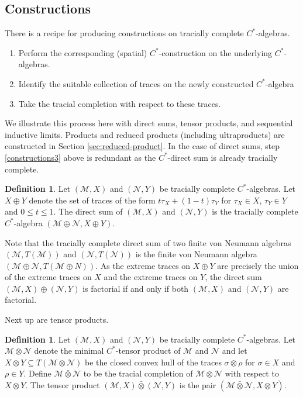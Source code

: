\documentclass[a4paper,11pt]{amsart}
\theoremstyle{definition}
\newtheorem{definition}[theorem]{Definition}
\numberwithin{equation}{section}
\numberwithin{theorem}{section}
\newcommand{\M}{\mathcal{M}}
\newcommand{\barotimes}{\bar\otimes}
\begin{document}
\subsection{Constructions} There is a recipe for producing constructions on tracially complete $C^*$-algebras.
\begin{enumerate}
\item Perform the corresponding (spatial) $C^*$-construction on the underlying $C^*$-algebras.
\item Identify the suitable collection of traces on the newly constructed $C^*$-algebra
\item Take the tracial completion with respect to these traces.\label{constructions3}
\end{enumerate}

We illustrate this process here with direct sums, tensor products, and sequential inductive limits. Products and reduced products (including ultraproducts) are constructed in Section \ref{sec:reduced-product}.  In the case of direct sums, step \ref{constructions3} above is redundant as the $C^*$-direct sum is already tracially complete.

\begin{definition}\label{def:UTCdirect-sums}
Let $(\M,X)$ and $(\mathcal N,Y)$ be tracially complete $C^*$-algebras.  Let $X\oplus Y$ denote the set of traces of the form $t \tau_X+(1-t)\tau_Y$ for $\tau_X\in X$, $\tau_Y\in Y$ and $0\leq t \leq 1$.  The direct sum of $(\M,X)$ and $(\mathcal N,Y)$ is the tracially complete $C^*$-algebra $(\M\oplus \mathcal N,X\oplus Y)$. 
\end{definition}

Note that the tracially complete direct sum of two finite von Neumann algebras $(\M,T(\M))$ and $(\mathcal N,T(\mathcal N))$ is the finite von Neumann algebra $(\M\oplus \mathcal N,T(\mathcal M\oplus N))$. As the extreme traces on $X\oplus Y$ are precisely the union of the extreme traces on $X$ and the extreme traces on $Y$, the direct sum $(\M,X)\oplus (\mathcal N,Y)$ is factorial if and only if both $(\M,X)$ and $(\mathcal N,Y)$ are factorial.

Next up are tensor products.

\begin{definition}\label{def:UTCtensor-products}
Let $(\M,X)$ and $(\mathcal{N},Y)$ be tracially complete $C^*$-algebras.  Let $\M \otimes \mathcal N$ denote the minimal $C^*$-tensor product of $\M$ and $\mathcal N$ and let $X \otimes Y \subseteq T(\M \otimes \mathcal N)$ be the closed convex hull of the traces $\sigma \otimes \rho$ for $\sigma \in X$ and $\rho \in Y$.  Define $\M \barotimes \mathcal{N}$ to be the tracial completion of $\M \otimes \mathcal N$ with respect to $X \otimes Y$. The tensor product $(\M,X) \barotimes (\mathcal{N},Y)$ is the pair $(\M \barotimes \mathcal N, X \otimes Y)$.
\end{definition}
\end{document}

